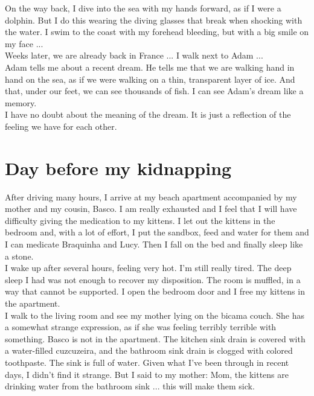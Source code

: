 \documentclass[11pt]{book}
\begin{document}
\noindent On the way back, I dive into the sea with my hands forward, as if I were a dolphin. But I do this wearing the diving glasses that break when shocking with the water. I swim to the coast with my forehead bleeding, but with a big smile on my face ... \\

\noindent Weeks later, we are already back in France ... I walk next to Adam ... \\

\noindent Adam tells me about a recent dream. He tells me that we are walking hand in hand on the sea, as if we were walking on a thin, transparent layer of ice. And that, under our feet, we can see thousands of fish. I can see Adam's dream like a memory. \\

\noindent I have no doubt about the meaning of the dream. It is just a reflection of the feeling we have for each other.

\chapter{Day before my kidnapping}

\noindent After driving many hours, I arrive at my beach apartment accompanied by my mother and my cousin, Basco. I am really exhausted and I feel that I will have difficulty giving the medication to my kittens. I let out the kittens in the bedroom and, with a lot of effort, I put the sandbox, feed and water for them and I can medicate Braquinha and Lucy. Then I fall on the bed and finally sleep like a stone. \\

\noindent I wake up after several hours, feeling very hot. I'm still really tired. The deep sleep I had was not enough to recover my disposition. The room is muffled, in a way that cannot be supported. I open the bedroom door and I free my kittens in the apartment.  \\

\noindent I walk to the living room and see my mother lying on the bicama couch. She has a somewhat strange expression, as if she was feeling terribly terrible with something. Basco is not in the apartment. The kitchen sink drain is covered with a water-filled cuzcuzeira, and the bathroom sink drain is clogged with colored toothpaste. The sink is full of water. Given what I've been through in recent days, I didn't find it strange. But I said to my mother: Mom, the kittens are drinking water from the bathroom sink ... this will make them sick.  \\
\end{document}
